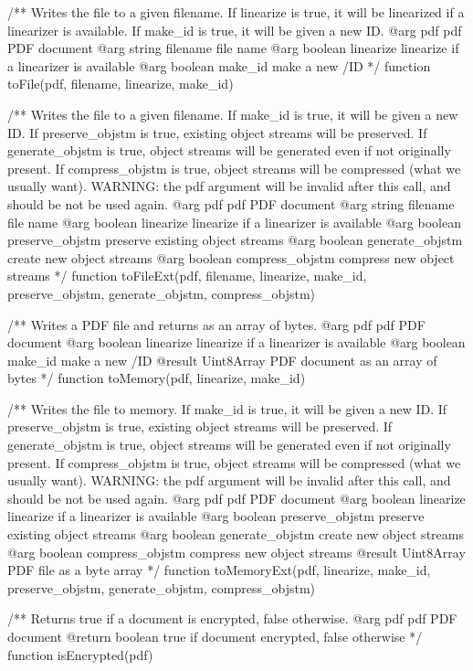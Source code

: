/** Writes the file to a given filename. If linearize is true, it will be
linearized if a linearizer is available. If make_id is true, it will be
given a new ID.
@arg {pdf} pdf PDF document
@arg {string} filename file name
@arg {boolean} linearize linearize if a linearizer is available
@arg {boolean} make_id make a new /ID */
function toFile(pdf, filename, linearize, make_id) {}

/** Writes the file to a given filename. If make_id is true, it will be given
a new ID.  If preserve_objstm is true, existing object streams will be
preserved. If generate_objstm is true, object streams will be generated even if
not originally present. If compress_objstm is true, object streams will be
compressed (what we usually want). WARNING: the pdf argument will be invalid
after this call, and should be not be used again.
@arg {pdf} pdf PDF document
@arg {string} filename file name
@arg {boolean} linearize linearize if a linearizer is available
@arg {boolean} preserve_objstm preserve existing object streams
@arg {boolean} generate_objstm create new object streams
@arg {boolean} compress_objstm compress new object streams */
function toFileExt(pdf, filename, linearize, make_id, preserve_objstm, generate_objstm, compress_objstm) {}

/** Writes a PDF file and returns as an array of bytes.
@arg {pdf} pdf PDF document
@arg {boolean} linearize linearize if a linearizer is available
@arg {boolean} make_id make a new /ID
@result {Uint8Array} PDF document as an array of bytes */
function toMemory(pdf, linearize, make_id) {}

/** Writes the file to memory. If make_id is true, it will be given
a new ID.  If preserve_objstm is true, existing object streams will be
preserved. If generate_objstm is true, object streams will be generated even if
not originally present. If compress_objstm is true, object streams will be
compressed (what we usually want). WARNING: the pdf argument will be invalid
after this call, and should be not be used again.
@arg {pdf} pdf PDF document
@arg {boolean} linearize linearize if a linearizer is available
@arg {boolean} preserve_objstm preserve existing object streams
@arg {boolean} generate_objstm create new object streams
@arg {boolean} compress_objstm compress new object streams
@result {Uint8Array} PDF file as a byte array */
function toMemoryExt(pdf, linearize, make_id, preserve_objstm, generate_objstm, compress_objstm) {}

/** Returns true if a document is encrypted, false otherwise.
@arg {pdf} pdf PDF document
@return {boolean} true if document encrypted, false otherwise */
function isEncrypted(pdf) {}

